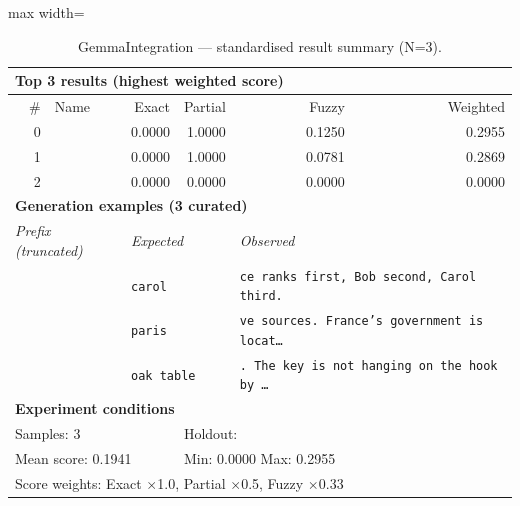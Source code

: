 \begin{table}[htbp]
\centering
\caption{GemmaIntegration — standardised result summary (N=3).}
\label{tab:gemmaintegration_summary}
\begin{adjustbox}{max width=\textwidth}
\begin{tabular}{r p{5cm} r r r r}
\toprule
\multicolumn{6}{l}{\textbf{Top 3 results (highest weighted score)}} \\
\midrule
\# & Name & Exact & Partial & Fuzzy & Weighted \\
\midrule
0 &  & 0.0000 & 1.0000 & 0.1250 & 0.2955 \\
1 &  & 0.0000 & 1.0000 & 0.0781 & 0.2869 \\
2 &  & 0.0000 & 0.0000 & 0.0000 & 0.0000 \\
\midrule
\multicolumn{6}{l}{\textbf{Generation examples (3 curated)}} \\
\midrule
\multicolumn{2}{l}{\textit{Prefix (truncated)}} & \multicolumn{2}{l}{\textit{Expected}} & \multicolumn{2}{l}{\textit{Observed}} \\
\midrule
\multicolumn{2}{l}{\texttt{}} & \multicolumn{2}{l}{\texttt{carol}} & \multicolumn{2}{l}{\texttt{ce ranks first, Bob second, Carol third.}} \\
\multicolumn{2}{l}{\texttt{}} & \multicolumn{2}{l}{\texttt{paris}} & \multicolumn{2}{l}{\texttt{ve sources. France's government is locat\ldots}} \\
\multicolumn{2}{l}{\texttt{}} & \multicolumn{2}{l}{\texttt{oak table}} & \multicolumn{2}{l}{\texttt{. The key is not hanging on the hook by \ldots}} \\
\midrule
\multicolumn{6}{l}{\textbf{Experiment conditions}} \\
\midrule
\multicolumn{3}{l}{Samples: 3} & \multicolumn{3}{l}{Holdout: } \\
\multicolumn{3}{l}{Mean score: 0.1941} & \multicolumn{3}{l}{Min: 0.0000 \quad Max: 0.2955} \\
\multicolumn{6}{l}{Score weights: Exact $\times$1.0, Partial $\times$0.5, Fuzzy $\times$0.33} \\
\bottomrule
\end{tabular}
\end{adjustbox}
\end{table}
